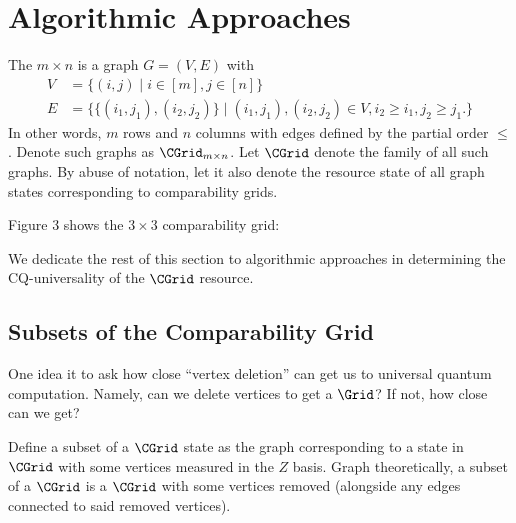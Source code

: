 \section{Algorithmic Approaches}

\begin{definition}
The $m \times n$  is a graph $G = (V,E)$ with
\begin{align}
    V &= \{(i,j) \mid i \in [m], j \in [n]\} \\
    \label{eq:comp-grid-edges}
    E &= \{ \{(i_1,j_1),(i_2,j_2)\} \mid (i_1,j_1),(i_2,j_2) \in V, i_2 \geq i_1, j_2 \geq j_1. \}
\end{align}
In other words, $m$ rows and $n$ columns with edges defined by the partial order $\leq$. Denote such graphs as $\CGrid_{m \times n}$. Let $\CGrid$ denote the family of all such graphs. By abuse of notation, let it also denote the resource state of all graph states corresponding to comparability grids.
\end{definition}

\begin{example}
Figure 3 shows the $3 \times 3$ comparability grid:

\end{example}

We dedicate the rest of this section to algorithmic approaches in determining the CQ-universality of the $\CGrid$ resource.

\subsection{Subsets of the Comparability Grid}

One idea it to ask how close ``vertex deletion'' can get us to universal quantum computation. Namely, can we delete vertices to get a $\Grid$? If not, how close can we get?

\begin{definition}
Define a subset of a $\CGrid$ state as the graph corresponding to a state in $\CGrid$ with some vertices measured in the $Z$ basis. Graph theoretically, a subset of a $\CGrid$ is a $\CGrid$ with some vertices removed (alongside any edges connected to said removed vertices).
\end{definition}

